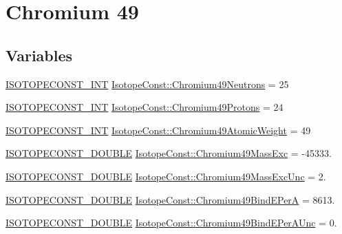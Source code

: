 \hypertarget{group___isotope_const-_chromium-_cr49}{}\section{Chromium 49}
\label{group___isotope_const-_chromium-_cr49}
\subsection*{Variables}
\begin{DoxyCompactItemize}
\item 
\mbox{\hyperlink{group___isotope_const-_macros_ga5f18360b3e99483a35c32d789e62621c}{I\+S\+O\+T\+O\+P\+E\+C\+O\+N\+S\+T\+\_\+\+I\+NT}} \mbox{\hyperlink{group___isotope_const-_chromium-_cr49_gabf4ef8e79288f1ca2bd9e06ab1c32789}{Isotope\+Const\+::\+Chromium49\+Neutrons}} = 25
\item 
\mbox{\hyperlink{group___isotope_const-_macros_ga5f18360b3e99483a35c32d789e62621c}{I\+S\+O\+T\+O\+P\+E\+C\+O\+N\+S\+T\+\_\+\+I\+NT}} \mbox{\hyperlink{group___isotope_const-_chromium-_cr49_ga3e2f0d13e72da3396ce70f63b7a18514}{Isotope\+Const\+::\+Chromium49\+Protons}} = 24
\item 
\mbox{\hyperlink{group___isotope_const-_macros_ga5f18360b3e99483a35c32d789e62621c}{I\+S\+O\+T\+O\+P\+E\+C\+O\+N\+S\+T\+\_\+\+I\+NT}} \mbox{\hyperlink{group___isotope_const-_chromium-_cr49_gafac74e7033499892b2186da262e7a357}{Isotope\+Const\+::\+Chromium49\+Atomic\+Weight}} = 49
\item 
\mbox{\hyperlink{group___isotope_const-_macros_ga8f45a7272ce02c0b4c65c44636ed719a}{I\+S\+O\+T\+O\+P\+E\+C\+O\+N\+S\+T\+\_\+\+D\+O\+U\+B\+LE}} \mbox{\hyperlink{group___isotope_const-_chromium-_cr49_ga9eb680033d5ec3ac7d210797aed93038}{Isotope\+Const\+::\+Chromium49\+Mass\+Exc}} = -\/45333.
\item 
\mbox{\hyperlink{group___isotope_const-_macros_ga8f45a7272ce02c0b4c65c44636ed719a}{I\+S\+O\+T\+O\+P\+E\+C\+O\+N\+S\+T\+\_\+\+D\+O\+U\+B\+LE}} \mbox{\hyperlink{group___isotope_const-_chromium-_cr49_ga3d17a67673c2687f7d284ca6dea750d4}{Isotope\+Const\+::\+Chromium49\+Mass\+Exc\+Unc}} = 2.
\item 
\mbox{\hyperlink{group___isotope_const-_macros_ga8f45a7272ce02c0b4c65c44636ed719a}{I\+S\+O\+T\+O\+P\+E\+C\+O\+N\+S\+T\+\_\+\+D\+O\+U\+B\+LE}} \mbox{\hyperlink{group___isotope_const-_chromium-_cr49_gaff074e9822f96c30e2375015a5e98539}{Isotope\+Const\+::\+Chromium49\+Bind\+E\+PerA}} = 8613.
\item 
\mbox{\hyperlink{group___isotope_const-_macros_ga8f45a7272ce02c0b4c65c44636ed719a}{I\+S\+O\+T\+O\+P\+E\+C\+O\+N\+S\+T\+\_\+\+D\+O\+U\+B\+LE}} \mbox{\hyperlink{group___isotope_const-_chromium-_cr49_gaea1bf19d42fb24076edff78d63d32904}{Isotope\+Const\+::\+Chromium49\+Bind\+E\+Per\+A\+Unc}} = 0.

\end{DoxyCompactItemize}
